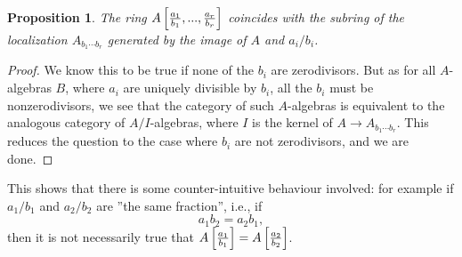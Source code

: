 \documentclass[12pt,a4paper,leqno]{article}
\theoremstyle{plain}
\newtheorem{prop}[theo]{Proposition}
\theoremstyle{definition}
\theoremstyle{remark}
\begin{document}
\begin{prop}\label{PartOfLocalization}
The ring $A \left[ {a_1 \over b_1}, ..., {a_r \over b_r}\right]$ coincides with the subring of the localization $A_{b_1 \cdots b_r}$ generated by the image of $A$ and $a_i / b_i$.
\end{prop}
\begin{proof}
We know this to be true if none of the $b_i$ are zerodivisors. But as for all $A$-algebras $B$, where $a_i$ are uniquely divisible by $b_i$, all the $b_i$ must be nonzerodivisors, we see that the category of such $A$-algebras is equivalent to the analogous category of $A/I$-algebras, where $I$ is the kernel of $A \to A_{b_1 \cdots b_r}$. This reduces the question to the case where $b_i$ are not zerodivisors, and we are done.
\end{proof}

This shows that there is some counter-intuitive behaviour involved: for example if $a_1 / b_1$ and $a_2 / b_2$ are ''the same fraction'', i.e., if
\begin{equation*}
a_1 b_2 = a_2 b_1,
\end{equation*}
then it is not necessarily true that $A \left[ {a_1 \over b_1}\right] = A \left[ {a_2 \over b_2}\right]$.
\end{document}
